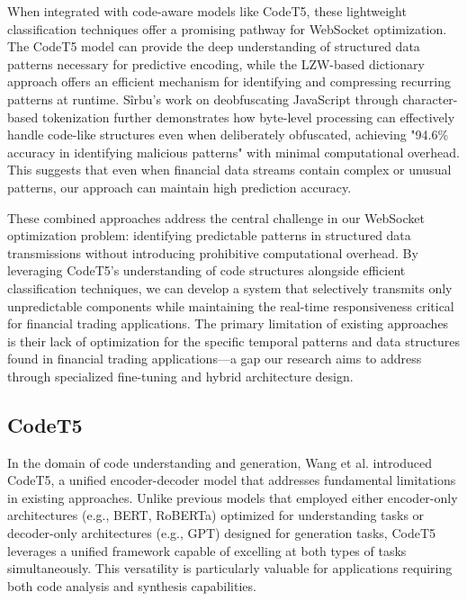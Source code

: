 \documentclass[a4paper, 11pt, twoside, openright]{report}
\begin{document}
When integrated with code-aware models like CodeT5, these lightweight classification techniques offer a promising pathway for WebSocket optimization. The CodeT5 model can provide the deep understanding of structured data patterns necessary for predictive encoding, while the LZW-based dictionary approach offers an efficient mechanism for identifying and compressing recurring patterns at runtime. Sîrbu's work on deobfuscating JavaScript through character-based tokenization \cite{DeobfuscJS2023} further demonstrates how byte-level processing can effectively handle code-like structures even when deliberately obfuscated, achieving "94.6\% accuracy in identifying malicious patterns" with minimal computational overhead. This suggests that even when financial data streams contain complex or unusual patterns, our approach can maintain high prediction accuracy.

These combined approaches address the central challenge in our WebSocket optimization problem: identifying predictable patterns in structured data transmissions without introducing prohibitive computational overhead. By leveraging CodeT5's understanding of code structures alongside efficient classification techniques, we can develop a system that selectively transmits only unpredictable components while maintaining the real-time responsiveness critical for financial trading applications. The primary limitation of existing approaches is their lack of optimization for the specific temporal patterns and data structures found in financial trading applications—a gap our research aims to address through specialized fine-tuning and hybrid architecture design.

\subsection{CodeT5}
In the domain of code understanding and generation, Wang et al. introduced CodeT5, a unified encoder-decoder model that addresses fundamental limitations in existing approaches. Unlike previous models that employed either encoder-only architectures (e.g., BERT, RoBERTa) optimized for understanding tasks or decoder-only architectures (e.g., GPT) designed for generation tasks, CodeT5 leverages a unified framework capable of excelling at both types of tasks simultaneously. This versatility is particularly valuable for applications requiring both code analysis and synthesis capabilities.
\end{document}
